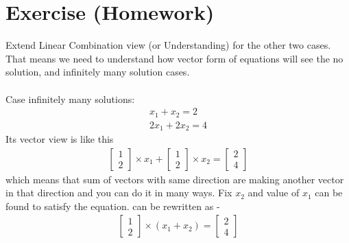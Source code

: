\documentclass{article}
\begin{document}
\section{Exercise (Homework)}

Extend Linear Combination view (or Understanding) for the other two cases. That means we need to understand how vector form of equations will see the no solution, and infinitely many solution cases.\\ \\
Case infinitely many solutions:
\begin{align}
    x_1 + x_2 = 2 \nonumber\\
    2x_1 + 2x_2 = 4  \nonumber
\end{align}
Its vector view is like this
\begin{align}
    \begin{bmatrix}
    1\\2
    \end{bmatrix} \times x_1 +
    \begin{bmatrix}
    1\\2
    \end{bmatrix} \times x_2 = 
    \begin{bmatrix}
    2\\4
    \end{bmatrix} \nonumber
\end{align}
which means that sum of vectors with same direction are making another vector in that direction and you can do it in many ways. Fix $x_2$ and value of $x_1$ can be found to satisfy the equation.
can be rewritten as -
\begin{align}
    \begin{bmatrix}
    1\\2
    \end{bmatrix} \times (x_1 +x_2)=\begin{bmatrix}
    2\\4
    \end{bmatrix} \nonumber
\end{align}
\end{document}
